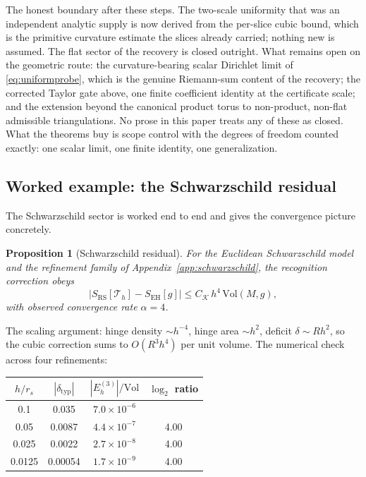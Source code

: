 \documentclass[11pt,letterpaper]{article}
\newtheorem{proposition}[theorem]{Proposition}
\theoremstyle{definition}
\newcommand{\RS}{\mathrm{RS}}
\newcommand{\EH}{\mathrm{EH}}
\newcommand{\Vol}{\mathrm{Vol}}
\begin{document}
The honest boundary after these steps.  The two-scale uniformity that
was an independent analytic supply is now derived from the per-slice
cubic bound, which is the primitive curvature estimate the slices
already carried; nothing new is assumed.  The flat sector of the
recovery is closed outright.  What remains open on the geometric
route: the curvature-bearing scalar Dirichlet limit of
\eqref{eq:uniformprobe}, which is the genuine Riemann-sum content of
the recovery; the corrected Taylor gate above, one finite coefficient
identity at the certificate scale; and the extension beyond the
canonical product torus to non-product, non-flat admissible
triangulations.  No prose in this paper treats any of these as
closed.  What the theorems buy is scope control with the degrees of
freedom counted exactly: one scalar limit, one finite identity, one
generalization.

\subsection{Worked example: the Schwarzschild residual}
\label{sec:schwarzschild}

The Schwarzschild sector is worked end to end and gives the convergence
picture concretely.

\begin{proposition}[Schwarzschild residual]\label{thm:residual}
For the Euclidean Schwarzschild model and the refinement family of
Appendix~\ref{app:schwarzschild}, the recognition correction obeys
\begin{equation}
|S_\RS[\mathcal{T}_h]-S_\EH[g]|
\le C_{\mathcal K}\,h^4\,\Vol(M,g),
\end{equation}
with observed convergence rate $\alpha=4$.
\end{proposition}

The scaling argument: hinge density $\sim h^{-4}$, hinge area
$\sim h^2$, deficit $\delta\sim Rh^2$, so the cubic correction sums to
$O(R^3h^4)$ per unit volume.  The numerical check across four
refinements:

\begin{center}
\begin{tabular}{cccc}
\toprule
$h/r_s$ & $|\delta_{\mathrm{typ}}|$ & $|E^{(3)}_h|/\Vol$
& $\log_2$ ratio \\
\midrule
0.1 & 0.035 & $7.0\times10^{-6}$ & \\
0.05 & 0.0087 & $4.4\times10^{-7}$ & 4.00 \\
0.025 & 0.0022 & $2.7\times10^{-8}$ & 4.00 \\
0.0125 & 0.00054 & $1.7\times10^{-9}$ & 4.00 \\
\bottomrule
\end{tabular}
\end{center}
\end{document}
